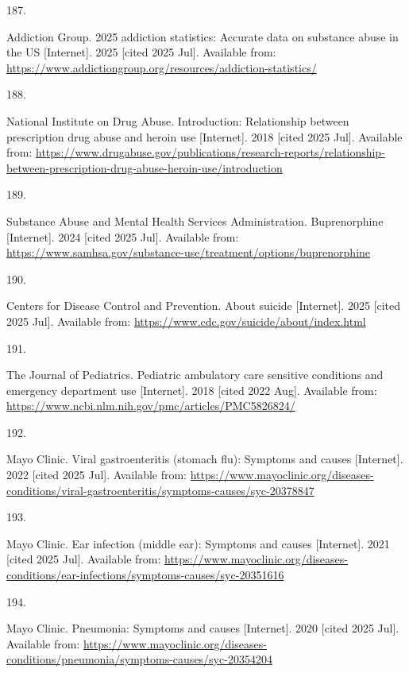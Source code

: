 \documentclass[
  english,
  letterpaper,
]{report}
\newlength{\cslhangindent}
\newlength{\csllabelwidth}
\newenvironment{CSLReferences}[2] %
 {\begin{list}{}{%
  \setlength{\itemindent}{0pt}
  \setlength{\leftmargin}{0pt}
  \setlength{\parsep}{0pt}
  \ifodd #1
   \setlength{\leftmargin}{\cslhangindent}
   \setlength{\itemindent}{-1\cslhangindent}
  \fi
  \setlength{\itemsep}{#2\baselineskip}}}
 {\end{list}}
\newcommand{\CSLLeftMargin}[1]{\parbox[t]{\csllabelwidth}{\strut#1\strut}}
\newcommand{\CSLRightInline}[1]{\parbox[t]{\linewidth - \csllabelwidth}{\strut#1\strut}}
\begin{document}
\begin{CSLReferences}{0}{1}
\CSLLeftMargin{187. }%
\CSLRightInline{Addiction Group. 2025 addiction statistics: Accurate
data on substance abuse in the US {[}Internet{]}. 2025 {[}cited 2025
Jul{]}. Available from:
\url{https://www.addictiongroup.org/resources/addiction-statistics/}}

\CSLLeftMargin{188. }%
\CSLRightInline{National Institute on Drug Abuse. Introduction:
Relationship between prescription drug abuse and heroin use
{[}Internet{]}. 2018 {[}cited 2025 Jul{]}. Available from:
\url{https://www.drugabuse.gov/publications/research-reports/relationship-between-prescription-drug-abuse-heroin-use/introduction}}

\CSLLeftMargin{189. }%
\CSLRightInline{Substance Abuse and Mental Health Services
Administration. Buprenorphine {[}Internet{]}. 2024 {[}cited 2025 Jul{]}.
Available from:
\url{https://www.samhsa.gov/substance-use/treatment/options/buprenorphine}}

\CSLLeftMargin{190. }%
\CSLRightInline{Centers for Disease Control and Prevention. About
suicide {[}Internet{]}. 2025 {[}cited 2025 Jul{]}. Available from:
\url{https://www.cdc.gov/suicide/about/index.html}}

\CSLLeftMargin{191. }%
\CSLRightInline{The Journal of Pediatrics. Pediatric ambulatory care
sensitive conditions and emergency department use {[}Internet{]}. 2018
{[}cited 2022 Aug{]}. Available from:
\url{https://www.ncbi.nlm.nih.gov/pmc/articles/PMC5826824/}}

\CSLLeftMargin{192. }%
\CSLRightInline{Mayo Clinic. Viral gastroenteritis (stomach flu):
Symptoms and causes {[}Internet{]}. 2022 {[}cited 2025 Jul{]}. Available
from:
\url{https://www.mayoclinic.org/diseases-conditions/viral-gastroenteritis/symptoms-causes/syc-20378847}}

\CSLLeftMargin{193. }%
\CSLRightInline{Mayo Clinic. Ear infection (middle ear): Symptoms and
causes {[}Internet{]}. 2021 {[}cited 2025 Jul{]}. Available from:
\url{https://www.mayoclinic.org/diseases-conditions/ear-infections/symptoms-causes/syc-20351616}}

\CSLLeftMargin{194. }%
\CSLRightInline{Mayo Clinic. Pneumonia: Symptoms and causes
{[}Internet{]}. 2020 {[}cited 2025 Jul{]}. Available from:
\url{https://www.mayoclinic.org/diseases-conditions/pneumonia/symptoms-causes/syc-20354204}}


\end{CSLReferences}
\end{document}
